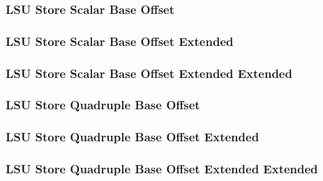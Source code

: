 

\subsubsection[{\small LSU Store Scalar Base Offset}]{LSU Store Scalar Base Offset} \label{sec:format-LSU-SSBO}



\subsubsection[{\small LSU Store Scalar Base Offset Extended}]{LSU Store Scalar Base Offset Extended} \label{sec:format-LSU-SSBO.X}



\subsubsection[{\small LSU Store Scalar Base Offset Extended Extended}]{LSU Store Scalar Base Offset Extended Extended} \label{sec:format-LSU-SSBO.Y}



\subsubsection[{\small LSU Store Quadruple Base Offset}]{LSU Store Quadruple Base Offset} \label{sec:format-LSU-SQBO}



\subsubsection[{\small LSU Store Quadruple Base Offset Extended}]{LSU Store Quadruple Base Offset Extended} \label{sec:format-LSU-SQBO.X}



\subsubsection[{\small LSU Store Quadruple Base Offset Extended Extended}]{LSU Store Quadruple Base Offset Extended Extended} \label{sec:format-LSU-SQBO.Y}

